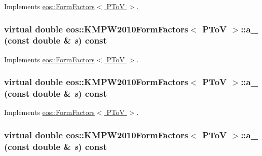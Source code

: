 Implements \hyperlink{classeos_1_1FormFactors_3_01PToV_01_4_ac1f21721a19b71abb3e3a433793db159}{eos::FormFactors$<$ PToV $>$}.\hypertarget{classeos_1_1KMPW2010FormFactors_3_01PToV_01_4_a9ed6f27dc8847077c7a66d56e72ccec1}{
\subsubsection[{a\_\-1}]{\setlength{\rightskip}{0pt plus 5cm}virtual double eos::KMPW2010FormFactors$<$ {\bf PToV} $>$::a\_ (const double \& {\em s}) const}}
\label{classeos_1_1KMPW2010FormFactors_3_01PToV_01_4_a9ed6f27dc8847077c7a66d56e72ccec1}


Implements \hyperlink{classeos_1_1FormFactors_3_01PToV_01_4_a0d6fdeca880da81163bbcdca7057bdcb}{eos::FormFactors$<$ PToV $>$}.\hypertarget{classeos_1_1KMPW2010FormFactors_3_01PToV_01_4_ab66c9cab243661f5fbabf76b42a060d4}{
\subsubsection[{a\_\-12}]{\setlength{\rightskip}{0pt plus 5cm}virtual double eos::KMPW2010FormFactors$<$ {\bf PToV} $>$::a\_ (const double \& {\em s}) const}}
\label{classeos_1_1KMPW2010FormFactors_3_01PToV_01_4_ab66c9cab243661f5fbabf76b42a060d4}


Implements \hyperlink{classeos_1_1FormFactors_3_01PToV_01_4_aba4400dbd92741ee82eb759c62a28fa9}{eos::FormFactors$<$ PToV $>$}.\hypertarget{classeos_1_1KMPW2010FormFactors_3_01PToV_01_4_a38d93dfcb8948cf55480fb40cddbb470}{
\subsubsection[{a\_\-2}]{\setlength{\rightskip}{0pt plus 5cm}virtual double eos::KMPW2010FormFactors$<$ {\bf PToV} $>$::a\_ (const double \& {\em s}) const}}
\label{classeos_1_1KMPW2010FormFactors_3_01PToV_01_4_a38d93dfcb8948cf55480fb40cddbb470}


